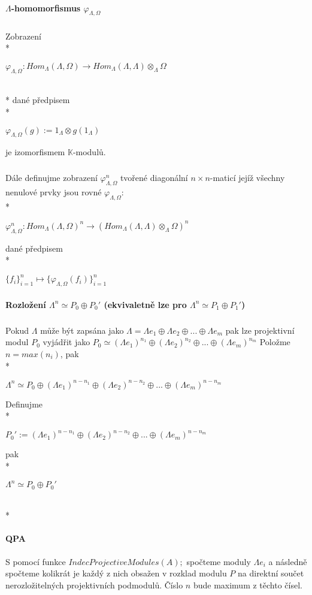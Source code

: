 \documentclass[7pt]{article}
\begin{document}
      \paragraph{$\Lambda$-homomorfismus $\varphi_{\Lambda, \Omega}$}
        \subparagraph{} Zobrazení \\*        
        \centerline{$\varphi_{\Lambda, \Omega}:Hom_\Lambda(\Lambda,\Omega)\rightarrow 
        Hom_\Lambda(\Lambda,\Lambda)\otimes_\Lambda \Omega$} \\*
        dané předpisem \\*
        \centerline{$\varphi_{\Lambda, \Omega}(g):=1_\Lambda\otimes g(1_\Lambda)$}
        je izomorfismem $\mathbb{K}$-modulů. 
        \subparagraph{} Dále definujme zobrazení $\varphi_{\Lambda, \Omega}^n$  
        tvořené diagonální $n\times n$-maticí jejíž všechny nenulové prvky jsou rovné 
        $\varphi_{\Lambda, \Omega}$:\\*
        \centerline{$
          \varphi_{\Lambda, \Omega}^n:
          Hom_\Lambda(\Lambda,\Omega)^n\rightarrow 
          (Hom_\Lambda(\Lambda,\Lambda)\otimes_\Lambda \Omega)^n
        $}
        dané předpisem \\*
        \centerline{$ \{f_i\}_{i=1}^n\mapsto  \{\varphi_{\Lambda,\Omega}(f_i)\}_{i=1}^n $}
        
      \paragraph{Rozložení $\Lambda^n\simeq P_0\oplus P_0'$ (ekvivaletně lze pro $\Lambda^n\simeq P_1\oplus P_1'$)}
        \subparagraph{} Pokud $\Lambda$ může být zapsána jako 
        $\Lambda=\Lambda e_1\oplus\Lambda e_2\oplus ... \oplus\Lambda e_m$
        pak lze projektivní modul $P_0$ vyjádřit jako
        $P_0\simeq(\Lambda e_1)^{n_1}\oplus(\Lambda e_2)^{n_2}\oplus ... \oplus(\Lambda 
        e_m)^{n_m}$
       Položme $n=max(n_i)$, pak \\*
       \centerline{$\Lambda^n\simeq P_0\oplus(\Lambda e_1)^{n-n_1}\oplus(\Lambda e_2)^{n-n_2}\oplus ... \oplus(\Lambda e_m)^{n-n_m}$} 
       Definujme \\*
       \centerline{$P_0':=(\Lambda e_1)^{n-n_1}\oplus(\Lambda e_2)^{n-n_2}\oplus ... \oplus(\Lambda e_m)^{n-n_m}$} 
       pak \\*
       \centerline{$\Lambda^n\simeq P_0\oplus P_0'$} \\*
       
     \paragraph{QPA} S pomocí funkce $IndecProjectiveModules(A);$ spočteme 
     moduly $\Lambda e_i$ a následně spočteme kolikrát je každý z nich obsažen v 
     rozklad modulu $P$ na direktní součet nerozložitelných projektivních podmodulů. 
     Číslo $n$ bude maximum z těchto čísel.
\end{document}
